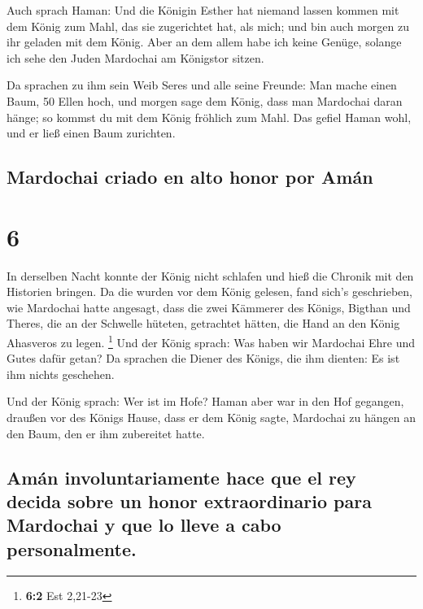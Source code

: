  Auch sprach Haman: Und die Königin Esther hat niemand
lassen kommen mit dem König zum Mahl, das sie zugerichtet hat, als mich;
und bin auch morgen zu ihr geladen mit dem König.  Aber
an dem allem habe ich keine Genüge, solange ich sehe den Juden Mardochai
am Königstor sitzen.

 Da sprachen zu ihm sein Weib Seres und alle seine
Freunde: Man mache einen Baum, 50 Ellen hoch, und morgen sage dem König,
dass man Mardochai daran hänge; so kommst du mit dem König fröhlich zum
Mahl. Das gefiel Haman wohl, und er ließ einen Baum zurichten.

\hypertarget{mardochai-criado-en-alto-honor-por-amuxe1n}{%
\subsection{Mardochai criado en alto honor por
Amán}\label{mardochai-criado-en-alto-honor-por-amuxe1n}}

\hypertarget{section-5}{%
\section{6}\label{section-5}}

 In derselben Nacht konnte der König nicht schlafen und
hieß die Chronik mit den Historien bringen. Da die wurden vor dem König
gelesen,  fand sich's geschrieben, wie Mardochai hatte
angesagt, dass die zwei Kämmerer des Königs, Bigthan und Theres, die an
der Schwelle hüteten, getrachtet hätten, die Hand an den König Ahasveros
zu legen. \footnote{\textbf{6:2} Est 2,21-23}  Und der
König sprach: Was haben wir Mardochai Ehre und Gutes dafür getan? Da
sprachen die Diener des Königs, die ihm dienten: Es ist ihm nichts
geschehen.

 Und der König sprach: Wer ist im Hofe? Haman aber war in
den Hof gegangen, draußen vor des Königs Hause, dass er dem König sagte,
Mardochai zu hängen an den Baum, den er ihm zubereitet hatte.

\hypertarget{amuxe1n-involuntariamente-hace-que-el-rey-decida-sobre-un-honor-extraordinario-para-mardochai-y-que-lo-lleve-a-cabo-personalmente.}{%
\subsection{Amán involuntariamente hace que el rey decida sobre un honor
extraordinario para Mardochai y que lo lleve a cabo
personalmente.}\label{amuxe1n-involuntariamente-hace-que-el-rey-decida-sobre-un-honor-extraordinario-para-mardochai-y-que-lo-lleve-a-cabo-personalmente.}}

